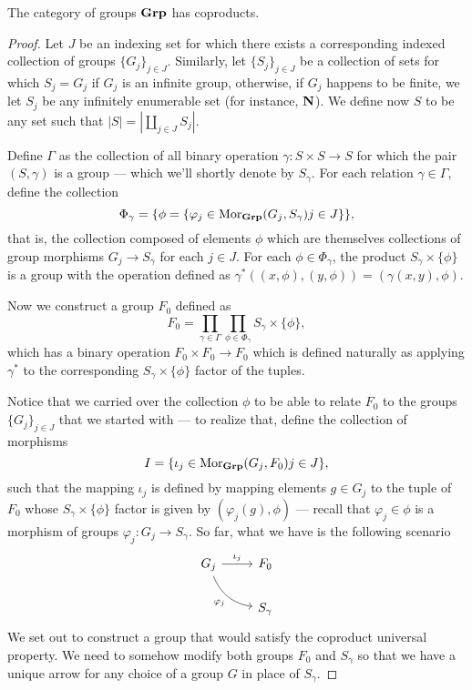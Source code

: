 \begin{proposition}
\label{prop:coprod-grp}
The category of groups \({\textbf{Grp}}\) has coproducts.
\end{proposition}

\begin{proof}
Let \(J\) be an indexing set for which there exists a corresponding indexed
collection of groups \(\{G_{j}\}_{j \in J}\). Similarly, let \(\{S_{j}\}_{j \in J}\)
be a collection of sets for which \(S_j = G_j\) if \(G_j\) is an infinite group,
otherwise, if \(G_j\) happens to be finite, we let \(S_j\) be any infinitely
enumerable set (for instance, \(\mathbf{N}\)). We define now \(S\) to be any set such
that \(|S| = |\coprod_{j \in J} S_{j}|\).

Define \(\Gamma\) as the collection of all binary operation \(\gamma: S \times S
\to S\) for which the pair \((S, \gamma)\) is a group --- which we'll shortly
denote by \(S_{\gamma}\). For each relation \(\gamma \in \Gamma\), define the
collection
\[
  \Phi_{\gamma} =
  \{\phi = \{\varphi_{j} \in \operatorname{Mor}_{{\textbf{Grp}}}(G_j, S_\gamma) \relax j \in J\}\},
\]
that is, the collection composed of elements \(\phi\) which are themselves
collections of group morphisms \(G_j \to S_\gamma\) for each \(j \in J\). For
each \(\phi \in \Phi_{\gamma}\), the product \(S_{\gamma} \times \{\phi\}\) is a
group with the operation defined as \(\gamma^{*}((x, \phi), (y, \phi)) =
(\gamma(x, y), \phi)\).

Now we construct a group \(F_0\) defined as
\[
  F_0 = \prod_{\gamma \in \Gamma}
  \prod_{\phi \in \Phi_{\gamma}} S_{\gamma} \times \{\phi\},
\]
which has a binary operation \(F_0 \times F_0 \to F_0\) which is defined
naturally as applying \(\gamma^{*}\) to the corresponding \(S_{\gamma} \times
\{\phi\}\) factor of the tuples.

Notice that we carried over the collection \(\phi\) to be able to relate \(F_0\)
to the groups \(\{G_{j}\}_{j \in J}\) that we started with --- to realize that,
define the collection of morphisms
\[
  I = \{\iota_{j} \in \operatorname{Mor}_{{\textbf{Grp}}}(G_j, F_0) \relax j \in J\},
\]
such that the mapping \(\iota_j\) is defined by mapping elements \(g \in G_j\)
to the tuple of \(F_0\) whose \(S_{\gamma} \times \{\phi\}\) factor is given by
\((\varphi_j(g), \phi)\) --- recall that \(\varphi_j \in \phi\) is a morphism of
groups \(\varphi_j: G_j \to S_{\gamma}\). So far, what we have is the following
scenario
\[
  \begin{tikzcd}
    G_j \ar[r, "\iota_j"] \ar[rd, bend right, swap, "\varphi_j"] &F_0 \\
    &S_\gamma
  \end{tikzcd}
\]
We set out to construct a group that would satisfy the coproduct universal
property. We need to somehow modify both groups \(F_0\) and \(S_{\gamma}\) so
that we have a unique arrow for any choice of a group \(G\) in place of
\(S_{\gamma}\).


\end{proof}
